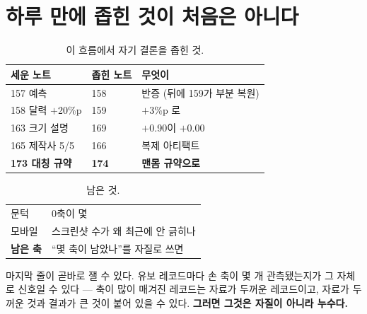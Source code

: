 \documentclass[10pt]{article}
\begin{document}

\section{하루 만에 좁힌 것이 처음은 아니다}

\begin{table}[t]
\centering\tsize
\caption{이 흐름에서 자기 결론을 좁힌 것.}
\begin{tabular}{lll}
\toprule
세운 노트 & 좁힌 노트 & 무엇이 \\
\midrule
157 예측 & 158 & 반증 (뒤에 159가 부분 복원) \\
158 달력 $+$20\%p & 159 & $+$3\%p 로 \\
163 크기 설명 & 169 & $+$0.90이 $+$0.00 \\
165 제작사 5/5 & 166 & 복제 아티팩트 \\
\textbf{173 대칭 규약} & \textbf{174} & \textbf{맨몸 규약으로} \\
\bottomrule
\end{tabular}
\end{table}


\begin{table}[t]
\centering\tsize
\caption{남은 것.}
\begin{tabular}{ll}
\toprule
문턱 & 0축이 몇 \\%
모바일 & 스크린샷 수가 왜 최근에 안 긁히나 \\
\textbf{남은 축} & ``몇 축이 남았나''를 자질로 쓰면 \\
\bottomrule
\end{tabular}
\end{table}

마지막 줄이 곧바로 잴 수 있다. 유보 레코드마다 손 축이 몇 개 관측됐는지가
그 자체로 신호일 수 있다 --- 축이 많이 매겨진 레코드는 자료가 두꺼운
레코드이고, 자료가 두꺼운 것과 결과가 큰 것이 붙어 있을 수 있다.
\textbf{그러면 그것은 자질이 아니라 누수다.}
\end{document}
